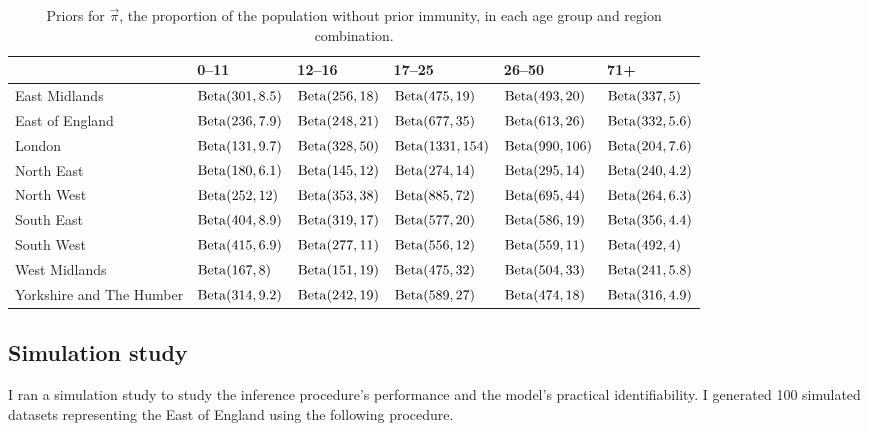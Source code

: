 \documentclass[thesis.tex]{subfiles}
\begin{document}
\begin{landscape}
\begin{table}
\centering
\begin{tabular}{l|lllll}
         & 0--11 & 12--16 & 17--25 & 26--50 & 71+ \\
        \hline
        East Midlands & $\operatorname{Beta}(301, 8.5)$ & $\operatorname{Beta}(256, 18)$ & $\operatorname{Beta}(475, 19)$ & $\operatorname{Beta}(493, 20)$ & $\operatorname{Beta}(337, 5)$ \\
        East of England & $\operatorname{Beta}(236, 7.9)$ & $\operatorname{Beta}(248, 21)$ & $\operatorname{Beta}(677, 35)$ & $\operatorname{Beta}(613, 26)$ & $\operatorname{Beta}(332, 5.6)$ \\
        London & $\operatorname{Beta}(131, 9.7)$ & $\operatorname{Beta}(328, 50)$ & $\operatorname{Beta}(1331, 154)$ & $\operatorname{Beta}(990, 106)$ & $\operatorname{Beta}(204, 7.6)$ \\
        North East & $\operatorname{Beta}(180, 6.1)$ & $\operatorname{Beta}(145, 12)$ & $\operatorname{Beta}(274, 14)$ & $\operatorname{Beta}(295, 14)$ & $\operatorname{Beta}(240, 4.2)$ \\
        North West & $\operatorname{Beta}(252, 12)$ & $\operatorname{Beta}(353, 38)$ & $\operatorname{Beta}(885, 72)$ & $\operatorname{Beta}(695, 44)$ & $\operatorname{Beta}(264, 6.3)$ \\
        South East & $\operatorname{Beta}(404, 8.9)$ & $\operatorname{Beta}(319, 17)$ & $\operatorname{Beta}(577, 20)$ & $\operatorname{Beta}(586, 19)$ & $\operatorname{Beta}(356, 4.4)$ \\
        South West & $\operatorname{Beta}(415, 6.9)$ & $\operatorname{Beta}(277, 11)$ & $\operatorname{Beta}(556, 12)$ & $\operatorname{Beta}(559, 11)$ & $\operatorname{Beta}(492, 4)$ \\
        West Midlands & $\operatorname{Beta}(167, 8)$ & $\operatorname{Beta}(151, 19)$ & $\operatorname{Beta}(475, 32)$ & $\operatorname{Beta}(504, 33)$ & $\operatorname{Beta}(241, 5.8)$ \\
        Yorkshire and The Humber & $\operatorname{Beta}(314, 9.2)$ & $\operatorname{Beta}(242, 19)$ & $\operatorname{Beta}(589, 27)$ & $\operatorname{Beta}(474, 18)$ & $\operatorname{Beta}(316, 4.9)$ \\
    \end{tabular}
\caption{Priors for $\vec{\pi}$, the proportion of the population without prior immunity, in each age group and region combination.}
\label{SEIR:table:immunity-prior}
\end{table}
\end{landscape}

\subsection{Simulation study} \label{SEIR:sec:sim-study}

I ran a simulation study to study the inference procedure's performance and the model's practical identifiability.
I generated 100 simulated datasets representing the East of England using the following procedure.
\end{document}
